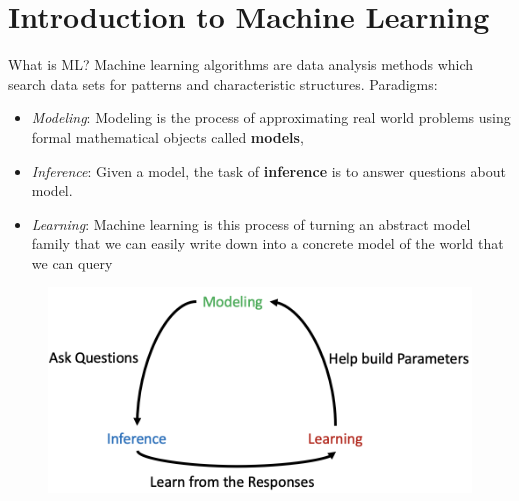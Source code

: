 \documentclass{beamer}
\begin{document}
\section{Introduction to Machine Learning}
\label{sec:MLintroduction}
\begin{frame}[allowframebreaks]{What is ML?}
Machine learning algorithms are data analysis methods which search data sets for patterns and characteristic structures.
\framebreak
\newline\newline
Paradigms:
\begin{itemize}
    \item \textit{Modeling}: Modeling is the process of approximating real world problems using formal mathematical objects called \textbf{models},
    \item \textit{Inference}: Given a model, the task of \textbf{inference} is to answer questions about model.
    \item \textit{Learning}: Machine learning is this process of turning an abstract model family that we can easily write down into a concrete model of the world that we can query
\end{itemize}
\framebreak
\begin{figure}
\centering
\captionsetup{justification=centering}
\includegraphics[scale=0.50]{Paradigm.png}
\end{figure}
\end{frame}
\end{document}
